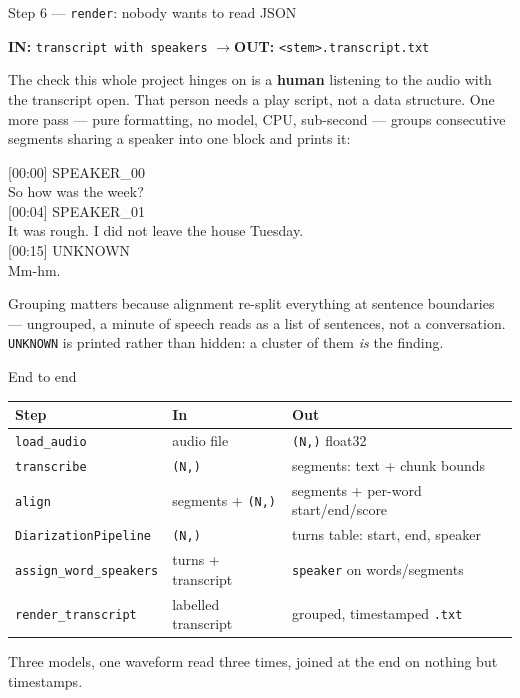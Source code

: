 \documentclass[aspectratio=169]{beamer}
\newcommand{\shapebox}[2]{%
  \begin{center}
  \colorbox{black!8}{\parbox{0.9\textwidth}{\centering
  \textbf{IN:} \texttt{#1} \qquad$\longrightarrow$\qquad \textbf{OUT:} \texttt{#2}}}
  \end{center}}
\begin{document}
\begin{frame}{Step 6 --- \texttt{render}: nobody wants to read JSON}

\shapebox{transcript with speakers}{\texttt{<stem>.transcript.txt}}

The check this whole project hinges on is a \textbf{human} listening to the audio with the
transcript open. That person needs a play script, not a data structure. One more pass ---
pure formatting, no model, CPU, sub-second --- groups consecutive segments sharing a speaker
into one block and prints it:

\begin{center}
\colorbox{black!8}{\parbox{0.88\textwidth}{\ttfamily\small
[00:00] SPEAKER\_00 \\
\hspace*{2em}So how was the week? \\[0.3em]
[00:04] SPEAKER\_01 \\
\hspace*{2em}It was rough. I did not leave the house Tuesday. \\[0.3em]
[00:15] UNKNOWN \\
\hspace*{2em}Mm-hm.
}}
\end{center}

\vspace{0.3em}
Grouping matters because alignment re-split everything at sentence boundaries --- ungrouped,
a minute of speech reads as a list of sentences, not a conversation. \texttt{UNKNOWN} is
printed rather than hidden: a cluster of them \emph{is} the finding.

\end{frame}

\begin{frame}{End to end}

\begin{center}
\small
\begin{tabular}{lll}
\toprule
\textbf{Step} & \textbf{In} & \textbf{Out} \\
\midrule
\texttt{load\_audio} & audio file & \texttt{(N,)} float32 \\
\texttt{transcribe} & \texttt{(N,)} & segments: text + chunk bounds \\
\texttt{align} & segments + \texttt{(N,)} & segments + per-word start/end/score \\
\texttt{DiarizationPipeline} & \texttt{(N,)} & turns table: start, end, speaker \\
\texttt{assign\_word\_speakers} & turns + transcript & \texttt{speaker} on words/segments \\
\texttt{render\_transcript} & labelled transcript & grouped, timestamped \texttt{.txt} \\
\bottomrule
\end{tabular}
\end{center}

\vspace{1em}
Three models, one waveform read three times, joined at the end on nothing but timestamps.

\end{frame}
\end{document}
